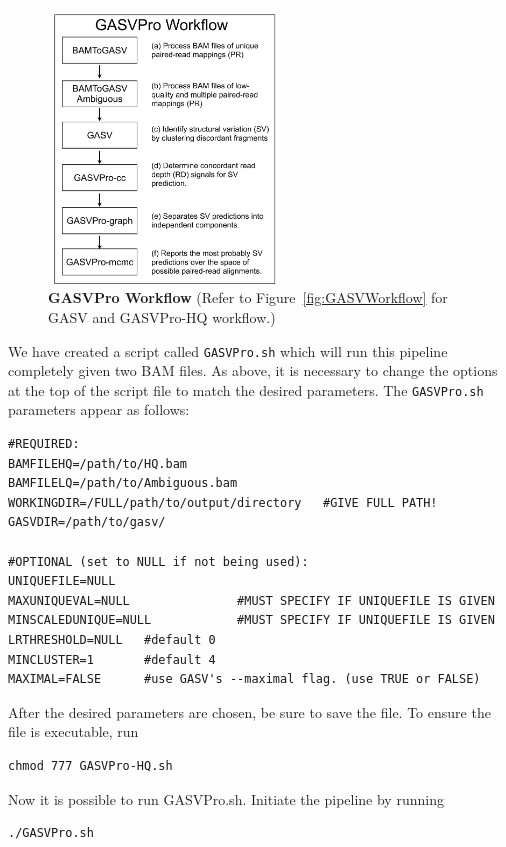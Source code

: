 \documentclass[11pt]{article}
\begin{document}
\begin{figure}[!htbp]
   \centering
    \includegraphics[width=0.55\textwidth]{Figures/GASVPro_Workflow.pdf}
  \caption{\textbf{GASVPro Workflow} (Refer to Figure~\ref{fig:GASVWorkflow} for GASV and GASVPro-HQ workflow.)}
  \label{fig:GASVProWorkflow}
\end{figure}


We have created a script called \verb+GASVPro.sh+ which will run this pipeline completely given two BAM files. As above, it is necessary to change the options at the top of the script file to match the desired parameters. The \verb+GASVPro.sh+ parameters appear as follows:
\begin {Verbatim}[frame=single]
#REQUIRED:
BAMFILEHQ=/path/to/HQ.bam
BAMFILELQ=/path/to/Ambiguous.bam
WORKINGDIR=/FULL/path/to/output/directory   #GIVE FULL PATH!
GASVDIR=/path/to/gasv/
                  
#OPTIONAL (set to NULL if not being used):
UNIQUEFILE=NULL
MAXUNIQUEVAL=NULL               #MUST SPECIFY IF UNIQUEFILE IS GIVEN
MINSCALEDUNIQUE=NULL            #MUST SPECIFY IF UNIQUEFILE IS GIVEN
LRTHRESHOLD=NULL   #default 0
MINCLUSTER=1       #default 4
MAXIMAL=FALSE      #use GASV's --maximal flag. (use TRUE or FALSE)
\end{Verbatim}

\noindent After the desired parameters are chosen, be sure to save the file. To ensure the file is executable, run 
\begin{Verbatim}[frame=single]
chmod 777 GASVPro-HQ.sh
\end{Verbatim}
Now it is possible to run GASVPro.sh. Initiate the pipeline by running 
\begin{Verbatim}[frame=single]
./GASVPro.sh
\end{Verbatim}
\end{document}
